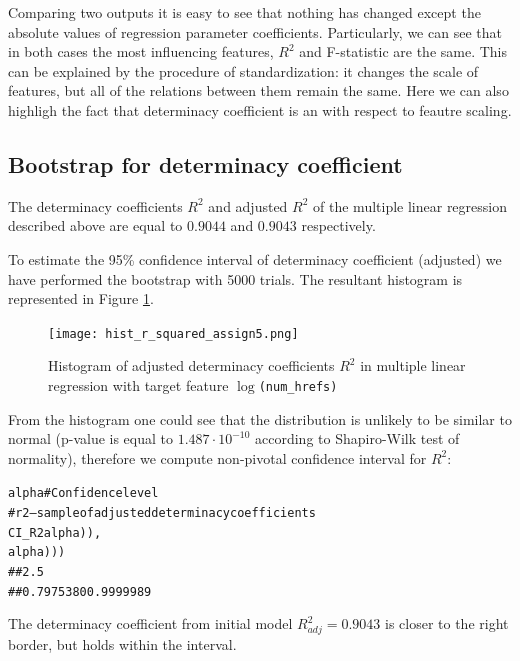 Comparing two outputs it is easy to see that nothing has changed except the absolute values of regression parameter  coefficients.
Particularly, we can see that in both cases the most influencing features, $R^2$ and F-statistic are the same.  This can be explained by the procedure of standardization: it changes the scale of features, but all of the relations between them remain the same.  Here we can also highligh the fact that determinacy coefficient is an with respect to feautre scaling.

\subsection{Bootstrap for determinacy coefficient}
The determinacy coefficients $R^2$ and adjusted $R^2$ of the multiple linear regression described above  are equal to $0.9044$ and $0.9043$ respectively. 

To estimate the 95\%  confidence interval of determinacy coefficient (adjusted) we have performed  the bootstrap  with 5000 trials. The resultant histogram is represented in Figure \ref{fig:hist_r_squared_bootstrap_assign5}. 

\begin{figure}[h!]
 \begin{center}
    \center \texttt{[image: hist\_r\_squared\_assign5.png]}
   \caption{Histogram of adjusted determinacy coefficients $R^2$ in multiple linear regression with target feature \texttt{$\log$(num\_hrefs)}}
   \label{fig:hist_r_squared_bootstrap_assign5}
 \end{center}
\end{figure} 

From the histogram one could see that the distribution is unlikely to be similar to normal (p-value is equal to $ 1.487\cdot 10^{-10} $ according to Shapiro-Wilk test of normality), therefore we compute non-pivotal confidence interval for $R^2$:
\begin{knitrout}
\color{fgcolor}\begin{kframe}
\begin{alltt}
alpha \hlkwb{<-}  # Confidence level
# r2 --- sample of adjusted determinacy coefficients
CI_R2 \hlkwb{<-} \hlstd{(}\hlstd{ = (} \hlopt{-} alpha)\hlopt{/}), 
            \hlstd{= (} \hlopt{+} alpha)\hlopt{/}))
##      2.5%
## 0.7975380 0.9999989 
\end{alltt}
\end{kframe}
\end{knitrout}

The determinacy coefficient from initial model $R^2_{adj} = 0.9043$ is closer to the right border, but holds within the interval. 